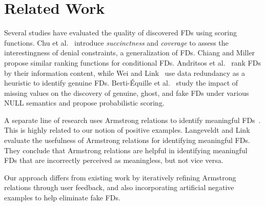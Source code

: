 
\section{Related Work}
Several studies have evaluated the quality of discovered FDs using scoring functions. Chu et al.~\citep{DBLP:journals/pvldb/ChuIP13} introduce \emph{succinctness} and \emph{coverage} to assess the interestingness of denial constraints, a generalization of FDs. Chiang and Miller~\citep{DBLP:journals/pvldb/ChiangM08} propose similar ranking functions for conditional FDs. Andritsos et al.~\citep{DBLP:conf/sigmod/AndritsosMT04} rank FDs by their information content, while Wei and Link~\citep{DBLP:journals/is/WeiL23} use data redundancy as a heuristic to identify genuine FDs. Berti-Équille et al.~\citep{DBLP:journals/pvldb/Berti-EquilleHN18} study the impact of missing values on the discovery of genuine, ghost, and fake FDs under various NULL semantics and propose probabilistic scoring. %

A separate line of research uses Armstrong relations to identify meaningful FDs~\citep{DBLP:conf/adbt/SilvaM79}. This is highly related to our notion of positive examples. Langeveldt and Link~\citep{DBLP:journals/is/LangeveldtL10} evaluate the usefulness of Armstrong relations for identifying meaningful FDs. They conclude that Armstrong relations are helpful in identifying meaningful FDs that are incorrectly perceived as meaningless, but not vice versa.

Our approach differs from existing work by iteratively refining Armstrong relations through user feedback, and also incorporating artificial negative examples to help eliminate fake FDs.

